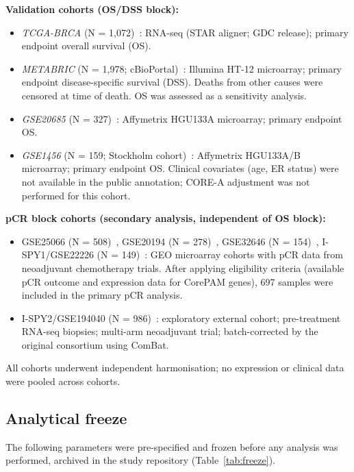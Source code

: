 \documentclass[referee,lineno,pdflatex,sn-vancouver-num]{sn-jnl}
\begin{document}
\textbf{Validation cohorts (OS/DSS block):}

\begin{itemize}
\item \textit{TCGA-BRCA} (N = 1,072)~\cite{tcga2012}: RNA-seq (STAR aligner; GDC release); primary endpoint overall survival (OS).
\item \textit{METABRIC} (N = 1,978; cBioPortal)~\cite{curtis2012}: Illumina HT-12 microarray; primary endpoint disease-specific survival (DSS). Deaths from other causes were censored at time of death. OS was assessed as a sensitivity analysis.
\item \textit{GSE20685} (N = 327)~\cite{kao2011}: Affymetrix HGU133A microarray; primary endpoint OS.
\item \textit{GSE1456} (N = 159; Stockholm cohort)~\cite{pawitan2005}: Affymetrix HGU133A/B microarray; primary endpoint OS. Clinical covariates (age, ER status) were not available in the public annotation; CORE-A adjustment was not performed for this cohort.
\end{itemize}

\textbf{pCR block cohorts (secondary analysis, independent of OS block):}

\begin{itemize}
\item GSE25066 (N = 508)~\cite{hatzis2011}, GSE20194 (N = 278)~\cite{maqc2010}, GSE32646 (N = 154)~\cite{miyake2012}, I-SPY1/GSE22226 (N = 149)~\cite{esserman2012}: GEO microarray cohorts with pCR data from neoadjuvant chemotherapy trials. After applying eligibility criteria (available pCR outcome and expression data for CorePAM genes), 697 samples were included in the primary pCR analysis.
\item I-SPY2/GSE194040 (N = 986)~\cite{wolf2022}: exploratory external cohort; pre-treatment RNA-seq biopsies; multi-arm neoadjuvant trial; batch-corrected by the original consortium using ComBat.
\end{itemize}

All cohorts underwent independent harmonisation; no expression or clinical data were pooled across cohorts.

\subsection{Analytical freeze}\label{subsec:analytical-freeze}

The following parameters were pre-specified and frozen before any analysis was performed, archived in the study repository (Table~\ref{tab:freeze}).
\end{document}
